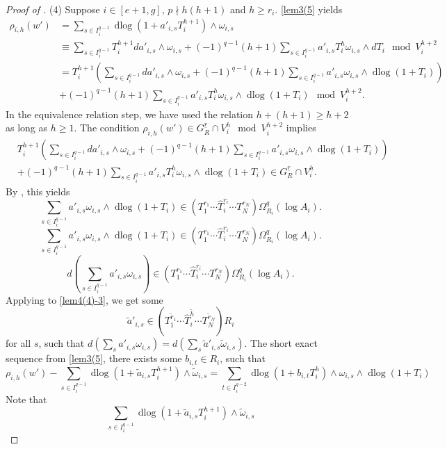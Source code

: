 \documentclass[11pt]{amsart}
\newcommand{\eq}[2]{\begin{equation}\label{#1}#2 \end{equation}}
\newcommand{\dlog}{\operatorname{dlog}}
\renewcommand{\hat}{\widehat}
\newcommand{\ul}{\underline}
\renewcommand{\tilde}{\widetilde}
\theoremstyle{plain}
\theoremstyle{definition}
\numberwithin{equation}{prop}
\begin{document}
\begin{proof}[Proof of ]
\vspace{0.5em}
(4)
Suppose $i\in [e+1,g]$, $p\nmid h(h+1)$ and $h\ge r_i$.
\eqref{lem3(5} yields
\begin{align*} 
\rho_{i,h}(w')
&=
\sum_{s\in I_i^{q-1}} \dlog(1+a'_{i,s}T_i^{h+1})\wedge\omega_{i,s}\\
&\equiv
\sum_{s\in I_i^{q-1}} 
T_i^{h+1}da'_{i,s}\wedge \omega_{i,s}
+
(-1)^{q-1}(h+1)
\sum_{s\in I_i^{q-1}} 
a'_{i,s}T_i^{h}\omega_{i,s}\wedge dT_i
\mod V_i^{h+2}
\\
&=T_i^{h+1}
\left(
\sum_{s\in I_i^{q-1}} 
da'_{i,s}\wedge \omega_{i,s}
+
(-1)^{q-1}(h+1)
\sum_{s\in I_i^{q-1}} 
a'_{i,s}\omega_{i,s}\wedge \dlog (1+T_i)
\right)
\\
&+
(-1)^{q-1}(h+1)
\sum_{s\in I_i^{q-1}} 
a'_{i,s}T_i^{h}\omega_{i,s}\wedge \dlog (1+T_i)
\mod V_i^{h+2}.
\end{align*} 
In the equivalence relation step, we have used the relation $h+(h+1)\ge h+2$ as long as $h\ge 1.$
The condition
$\rho_{i,h}(w')
\in G_R^{\ul r}\cap V_i^{h}
\mod  V_i^{h+2}$ implies 
\begin{align*}
&T_i^{h+1}\left(
\sum_{s\in I_i^{q-1}} 
da'_{i,s}\wedge \omega_{i,s}
+
(-1)^{q-1}(h+1)
\sum_{s\in I_i^{q-1}} 
a'_{i,s}\omega_{i,s}\wedge \dlog (1+T_i)
\right)
\\
&+
(-1)^{q-1}(h+1)
\sum_{s\in I_i^{q-1}} 
a'_{i,s}T_i^{h}\omega_{i,s}\wedge \dlog (1+T_i)
\in G_R^{\ul r}\cap V_i^{h}.
\end{align*}
By , this yields
\eq{lem4(4)-1}{\sum_{s\in I_i^{q-1}} 
a'_{i,s}\omega_{i,s}\wedge\dlog (1+T_i)\in 
(T_1^{r_1}\cdots\hat T_i^{r_i}\cdots  T_N^{r_N})\Omega^q_{R_i}(\log A_i).
}
\eq{lem4(4)-2}{\sum_{s\in I_i^{q-1}} 
a'_{i,s}\omega_{i,s}\wedge\dlog (1+T_i)\in 
(T_1^{r_1}\cdots\hat T_i^{r_i}\cdots  T_N^{r_N})\Omega^q_{R_i}(\log A_i).
}
\eq{lem4(4)-3}{
d\left(
\sum_{s\in I_i^{q-1}} 
a'_{i,s}\omega_{i,s}\right)
\in 
(T_1^{r_1}\cdots\hat T_i^{r_i}\cdots  T_N^{r_N})\Omega^q_{R_i}(\log A_i).
}
Applying  to \eqref{lem4(4)-3}, we get some 
$$\tilde a'_{i,s} \in 
(T_1^{\tilde r_1}\cdots\hat T_i^{\tilde h}\cdots T_N^{\tilde r_N}) R_i$$
for all $s$, such that 
$d(\sum_{s}a'_{i,s}\omega_{i,s})=d(\sum_{s}\tilde a'_{i,s}\tilde \omega_{i,s})$.
The short exact sequence from \eqref{lem3(5}, there exists some $b_{i,t}\in R_i$, such that
$$\rho_{i,h}(w')-
\sum_{s\in I_i^{q-1}} \dlog(1+\tilde a_{i,s}T_i^{h+1})\wedge\tilde\omega_{i,s}
=\sum_{t\in I_i^{q-2}} \dlog(1+b_{i,t}T_i^{h})\wedge\omega_{i,s}\wedge 
\dlog (1+T_i)
$$
Note that
$$\sum_{s\in I_i^{q-1}} \dlog(1+\tilde a_{i,s}T_i^{h+1})\wedge\tilde\omega_{i,s}
$$
\end{proof}
\end{document}

